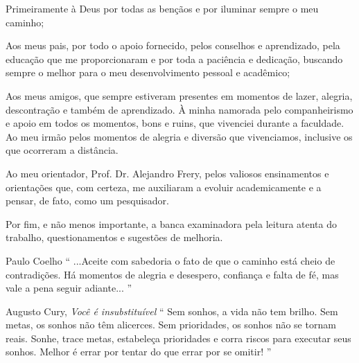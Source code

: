 \documentclass[tcc]{ic}
\begin{document}

\capa

\begin{agradecimentos}

Primeiramente à Deus por todas as bençãos e por iluminar sempre o meu caminho;

Aos meus pais, por todo o apoio fornecido, pelos conselhos e aprendizado, pela educação que me proporcionaram e por toda a paciência e dedicação, buscando sempre o melhor para o meu desenvolvimento pessoal e acadêmico;

Aos meus amigos, que sempre estiveram presentes em momentos de lazer, alegria, descontração e também de aprendizado. À minha namorada pelo companheirismo e apoio em todos os momentos, bons e ruins, que vivenciei durante a faculdade.
Ao meu irmão pelos momentos de alegria e diversão que vivenciamos, inclusive os que ocorreram a distância.

Ao meu orientador, Prof. Dr. Alejandro Frery, pelos valiosos ensinamentos e orientações que, com certeza, me auxiliaram a evoluir academicamente e a pensar, de fato, como um pesquisador.

Por fim, e não menos importante, a banca examinadora pela leitura atenta do trabalho, questionamentos e sugestões de melhoria.


\vspace{2em}
\begin{epigraph}{Paulo Coelho}
`` ...Aceite com sabedoria o fato de que o caminho está cheio de contradições. Há momentos de alegria e desespero, confiança e falta de fé, mas vale a pena seguir adiante... ''
\end{epigraph}



\newpage
\thispagestyle{empty}
\vspace*{\fill}
\begin{epigraph}{Augusto Cury, \textit{Você é insubstituível}}
`` Sem sonhos, a vida não tem brilho. Sem metas, os sonhos não têm alicerces. Sem prioridades, os sonhos não se tornam reais. Sonhe, trace metas, estabeleça prioridades e corra riscos para executar seus sonhos. Melhor é errar por tentar do que errar por se omitir! ''
\end{epigraph}

\begin{resumo}


\end{resumo}
\end{agradecimentos}
\end{document}
